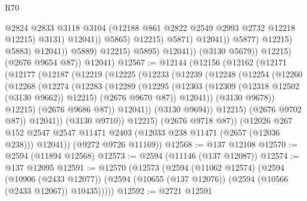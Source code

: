 \begin{lexlean}{R70}
\begin{coremodule}
                                                @2824
                                                @2833
                                                @3118
                                                @3104
                                                (@12188 @861 @2822 @2549 @2993 @2732 @12218 @12215)
                                                @3131)
                                              @12041))
                                          @5865)
                                        @12215)
                                      @5871)
                                    @12041))
                                @5877)
                              @12215)
                            @5883)
                          @12041))
                      @5889)
                    @12215)
                  @5895)
                @12041))
            (@3130 @5679))
          @12215)
        (@2676 @9654 @87))
      @12041)
@12567 := @12144
    (@12156
      (@12162
        (@12171
          (@12177
            (@12187
              (@12219
                (@12225
                  (@12233
                    (@12239
                      (@12248
                        (@12254
                          (@12260
                            (@12268
                              (@12274
                                (@12283
                                  (@12289
                                    (@12295
                                      (@12303
                                        (@12309 (@12318 @12502 (@3130 @9662)) @12215)
                                        (@2676 @9670 @87))
                                      @12041))
                                  (@3130 @9678))
                                @12215)
                              (@2676 @9686 @87))
                            @12041))
                        (@3130 @9694))
                      @12215)
                    (@2676 @9702 @87))
                  @12041))
              (@3130 @9710))
            @12215)
          (@2676 @9718 @87))
        (@12026
          @267
          @152
          @2547
          @2547
          @11471
          @2403
          (@12033 @238 @11471 (@2657 (@12036 @238)))
          @12041))
      (@9272 @9726 @11169))
@12568 := @137 @12108
@12570 := @2594 (@11894 @12568)
@12573 := @2594 (@11146 (@137 @12087))
@12574 := @137 @12095
@12591 := @12570
    (@12573
      (@2594
        (@11062 @12574)
        (@2594
          (@10906 (@2433 @12077))
          (@2594 (@10655 (@137 @12076)) (@2594 (@10566 (@2433 @12067)) @10435)))))
@12592 := @2721 @12591

\end{coremodule}
\end{lexlean}
